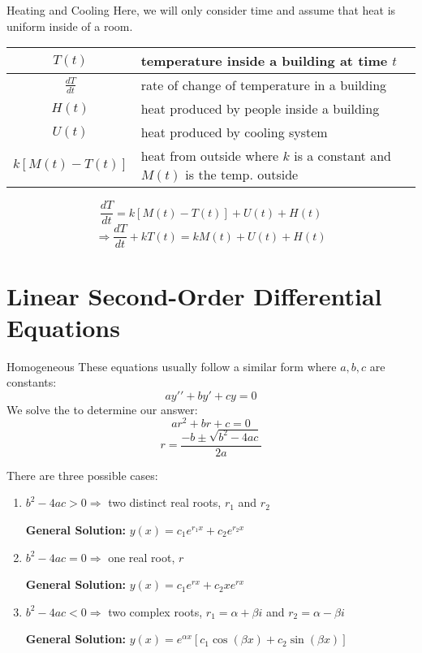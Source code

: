 \documentclass[12pt]{report}
\begin{document}
\begin{genbox}{Heating and Cooling}
	Here, we will only consider time and assume that heat is uniform inside of a room.
	
	\begin{tabular}{|c|l|} \hline
		$T(t)$ & temperature inside a building at time $t$ \\ \hline
		$\frac{dT}{dt}$ & rate of change of temperature in a building \\ \hline
		$H(t)$ & heat produced by people inside a building \\ \hline
		$U(t)$ & heat produced by cooling system \\ \hline
		$k[M(t)-T(t)]$ & heat from outside where $k$ is a constant and $M(t)$ is the temp. outside \\ \hline
	\end{tabular}
	$$\frac{dT}{dt} = k \left[ M(t) - T(t) \right] + U(t) + H(t) $$
	$$\Rightarrow \frac{dT}{dt} + kT(t) = kM(t) + U(t) + H(t)$$
\end{genbox}

\newpage
\chapter{Linear Second-Order Differential Equations}

\begin{genbox}{Homogeneous}
	These equations usually follow a similar form where $a,b,c$ are constants:
	$$ay\prime\prime + by\prime + cy = 0$$
	We solve the  to determine our answer:
	$$ar^2+br+c=0$$
	$$r = \frac{-b \pm \sqrt{b^2-4ac}}{2a}$$

	There are three possible cases:
	\begin{enumerate}
		\item $b^2-4ac>0 \Rightarrow $ two distinct real roots, $r_1$ and $r_2$
		
		\textbf{General Solution:} $y(x)=c_1e^{r_1x} + c_2e^{r_2x}$

		\item $b^2-4ac=0 \Rightarrow $ one real root, $r$
		
		\textbf{General Solution:} $y(x) =c_1e^{rx} + c_2xe^{rx}$

		\item $b^2-4ac<0 \Rightarrow $ two complex roots, $r_1 = \alpha + \beta i$ and $r_2 = \alpha - \beta i$
		
		\textbf{General Solution:} $y(x) = e^{\alpha x} \left[ c_1 \cos(\beta x) + c_2 \sin(\beta x) \right]$
	\end{enumerate}
\end{genbox}
\end{document}

